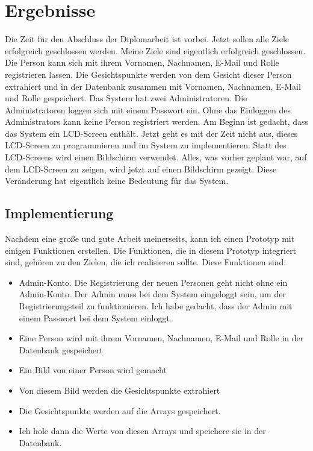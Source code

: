 \section{Ergebnisse}
Die Zeit f\"ur den Abschluss der Diplomarbeit ist vorbei. Jetzt sollen alle Ziele erfolgreich geschlossen werden. Meine Ziele sind eigentlich erfolgreich geschlossen. Die Person kann sich mit ihrem Vornamen, Nachnamen, E-Mail und Rolle registrieren lassen. Die Gesichtspunkte werden von dem Gesicht dieser Person extrahiert und in der Datenbank zusammen mit Vornamen, Nachnamen, E-Mail und Rolle gespeichert. Das System hat zwei Administratoren. Die Administratoren loggen sich mit einem Passwort ein. Ohne das Einloggen des Administrators kann keine Person registriert werden. Am Beginn ist gedacht, dass das System ein LCD-Screen enth\"alt. Jetzt geht es mit der Zeit nicht aus, dieses LCD-Screen zu programmieren und im System zu implementieren. Statt des LCD-Screens wird einen Bildschirm verwendet. Alles, was vorher geplant war, auf dem LCD-Screen zu zeigen, wird jetzt auf einen Bildschirm gezeigt. Diese Ver\"anderung hat eigentlich keine Bedeutung f\"ur das System. 
\subsection{Implementierung}
Nachdem eine gro{\ss}e und gute Arbeit meinerseits, kann ich einen Prototyp mit einigen Funktionen erstellen. Die Funktionen, die in diesem Prototyp integriert sind, geh\"oren zu den Zielen, die ich realisieren sollte. Diese Funktionen sind: 
\begin{itemize}
	\item Admin-Konto. Die Registrierung der neuen Personen geht nicht ohne ein Admin-Konto. Der Admin muss bei dem System eingeloggt sein, um der Registrierungsteil zu funktionieren. Ich habe gedacht, dass der Admin mit einem Passwort bei dem System einloggt. 
	\item Eine Person wird mit ihrem Vornamen, Nachnamen, E-Mail und Rolle in der Datenbank gespeichert
	\item Ein Bild von einer Person wird gemacht
	\item Von diesem Bild werden die Gesichtspunkte extrahiert
	\item Die Gesichtspunkte werden auf die Arrays gespeichert.
	\item Ich hole dann die Werte von diesen Arrays und speichere sie in der Datenbank.
\end{itemize}